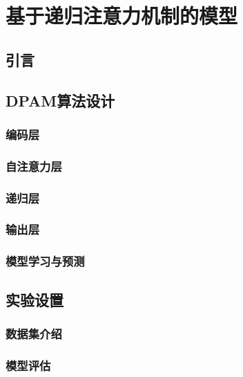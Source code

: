 
\chapter{基于递归注意力机制的模型}


\section{引言}


\section{DPAM算法设计}

\subsection{编码层}

\subsection{自注意力层}

\subsection{递归层}

\subsection{输出层}

\subsection{模型学习与预测}


\section{实验设置}

\subsection{数据集介绍}

\subsection{模型评估}

